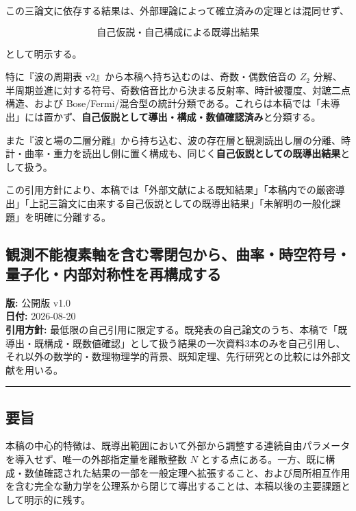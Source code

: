 \documentclass[
  a4paper,
]{ltjsarticle}
\begin{document}
この三論文に依存する結果は、外部理論によって確立済みの定理とは混同せず、

\[
\boxed{\text{自己仮説・自己構成による既導出結果}}
\]

として明示する。

特に『波の周期表 v2』から本稿へ持ち込むのは、奇数・偶数倍音の \(Z_2\)
分解、半周期並進に対する符号、奇数倍音比から決まる反射率、時計被覆度、対蹠二点構造、および
Bose/Fermi/混合型の統計分類である。これらは本稿では「未導出」には置かず、\textbf{自己仮説として導出・構成・数値確認済み}と分類する。

また『波と場の二層分離』から持ち込む、波の存在層と観測読出し層の分離、時計・曲率・重力を読出し側に置く構成も、同じく\textbf{自己仮説としての既導出結果}として扱う。

この引用方針により、本稿では「外部文献による既知結果」「本稿内での厳密導出」「上記三論文に由来する自己仮説としての既導出結果」「未解明の一般化課題」を明確に分離する。

\subsection{観測不能複素軸を含む零閉包から、曲率・時空符号・量子化・内部対称性を再構成する}\label{ux89b3ux6e2cux4e0dux80fdux8907ux7d20ux8ef8ux3092ux542bux3080ux96f6ux9589ux5305ux304bux3089ux66f2ux7387ux6642ux7a7aux7b26ux53f7ux91cfux5b50ux5316ux5185ux90e8ux5bfeux79f0ux6027ux3092ux518dux69cbux6210ux3059ux308b}

\textbf{版:} 公開版 v1.0\\
\textbf{日付:} 2026-08-20\\
\textbf{引用方針:}
最低限の自己引用に限定する。既発表の自己論文のうち、本稿で「既導出・既構成・既数値確認」として扱う結果の一次資料3本のみを自己引用し、それ以外の数学的・数理物理学的背景、既知定理、先行研究との比較には外部文献を用いる。

\begin{center}\rule{0.5\linewidth}{0.5pt}\end{center}

\subsection{要旨}\label{ux8981ux65e8}

本稿の中心的特徴は、既導出範囲において外部から調整する連続自由パラメータを導入せず、唯一の外部指定量を離散整数
\(N\)
とする点にある。一方、既に構成・数値確認された結果の一部を一般定理へ拡張すること、および局所相互作用を含む完全な動力学を公理系から閉じて導出することは、本稿以後の主要課題として明示的に残す。
\end{document}
